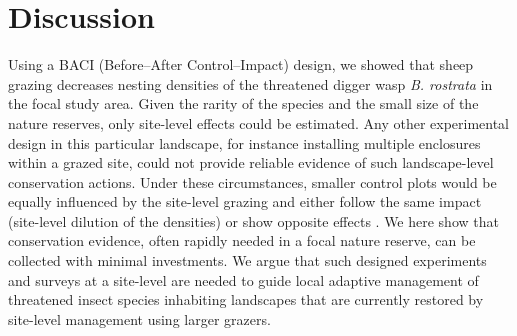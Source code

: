 \documentclass[10pt, twoside]{book} %
\begin{document}
	\section{Discussion}
	Using a BACI (Before--After Control--Impact) design, we showed that sheep grazing decreases nesting densities of the threatened digger wasp \textit{B. rostrata} in the focal study area. Given the rarity of the species and the small size of the nature reserves, only site-level effects could be estimated. Any other experimental design in this particular landscape, for instance installing multiple enclosures within a grazed site, could not provide reliable evidence of such landscape-level conservation actions. Under these circumstances, smaller control plots would be equally influenced by the site-level grazing and either follow the same impact (site-level dilution of the densities) or show opposite effects \citep[concentration effects in the few excluded plots][]{didham2020}. We here show that conservation evidence, often rapidly needed in a focal nature reserve, can be collected with minimal investments. We argue that such designed experiments and surveys at a site-level are needed to guide local adaptive management of threatened insect species inhabiting landscapes that are currently restored by site-level management using larger grazers.\\
	
\end{document}
